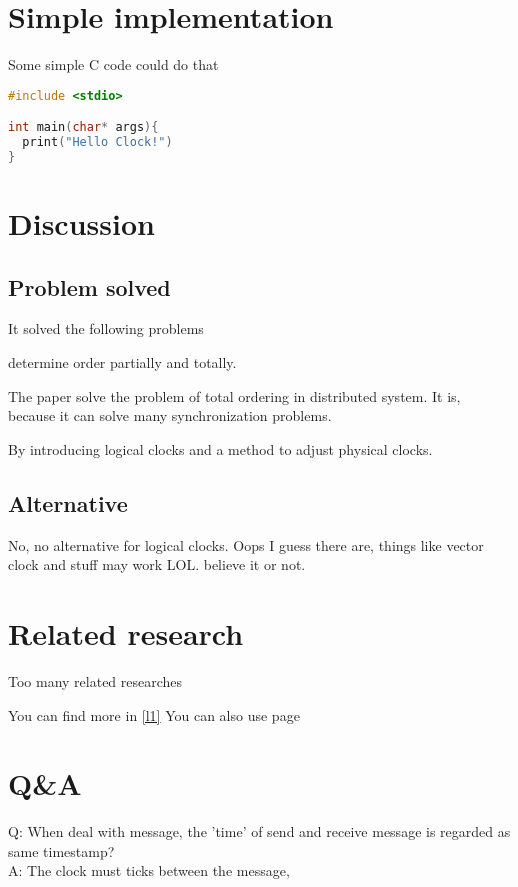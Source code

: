 \documentclass[12pt,a4paper,oneside]{article}
\begin{document}
\section{Simple implementation}

Some simple C code could do that

\begin{lstlisting}[language=C]
#include <stdio>

int main(char* args){
  print("Hello Clock!")
}
\end{lstlisting}

\section{Discussion}

\subsection{Problem solved}

It solved the following problems

determine order partially and totally. %

The paper solve the problem of total ordering in distributed system.
It is, because it can solve many synchronization problems.

By introducing logical clocks and a method to adjust physical clocks.

\subsection{Alternative}

No, no alternative for logical clocks. Oops I guess there are, things
like vector clock and stuff may work LOL. believe it or not.

\section{Related research}


Too many related researches

You can find more in \ref{l1}
You can also use page \pageref{l1}

\section{Q\&A}

Q: When deal with message, the 'time' of send and receive message is regarded as same timestamp? \\
A: The clock must ticks between the message,  %
\end{document}
